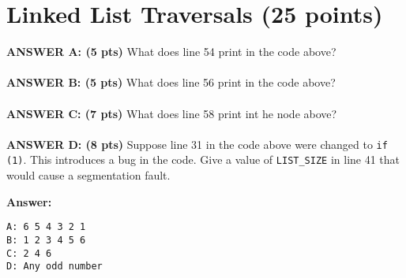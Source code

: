 \newpage
\section{Linked List Traversals  (25 points)}

\resetlinenumber[1]
\linenumbers
\begin{tt}

\end{tt}
\nolinenumbers

\noindent
{\bf ANSWER A: (5 pts)} What does line 54 print in the code above?
\\
~\\
{\bf ANSWER B: (5 pts)} What does line 56 print in the code above?
\\
~\\
{\bf ANSWER C: (7 pts)} What does line 58 print int he node above?
\\
~\\
{\bf ANSWER D: (8 pts)} Suppose line 31 in the code above were changed to {\tt if (1)}. This introduces a bug in the code. Give a value of {\tt LIST\_SIZE} in line 41 that would cause a segmentation fault.

\ifexam

\else
{\bf Answer:}
\begin{verbatim}
A: 6 5 4 3 2 1
B: 1 2 3 4 5 6
C: 2 4 6
D: Any odd number
\end{verbatim}

\fi
